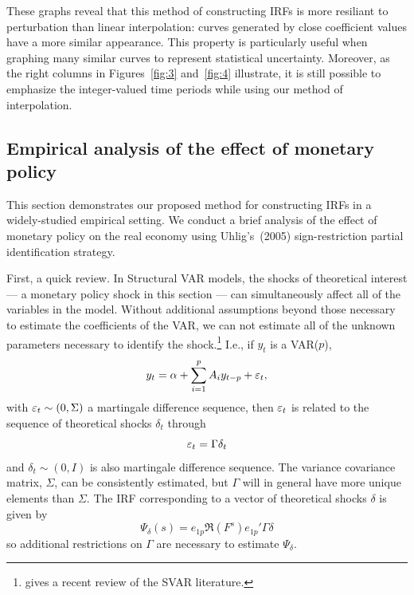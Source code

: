 \documentclass[12pt,fleqn]{article}
\begin{document}
These graphs reveal that this method of constructing IRFs is more
resiliant to perturbation than linear interpolation: curves generated
by close coefficient values have a more similar appearance. This
property is particularly useful when graphing many similar curves to
represent statistical uncertainty. Moreover, as the right columns in
Figures~\ref{fig:3} and~\ref{fig:4} illustrate, it is still possible
to emphasize the integer-valued time periods while using our method of
interpolation.

\subsection{Empirical analysis of the effect of monetary policy}
\label{S3.2}

This section demonstrates our proposed method for constructing IRFs
in a widely-studied empirical setting. We conduct a brief analysis of
the effect of monetary policy on the real economy using Uhlig's~(2005)
sign-restriction partial identification strategy.

First, a quick review. In Structural VAR models, the shocks of
theoretical interest --- a monetary policy shock in this section ---
can simultaneously affect all of the variables in the model. Without
additional assumptions beyond those necessary to estimate the
coefficients of the VAR, we can not estimate all of the unknown
parameters necessary to identify the shock.\footnote{%
  \citet{Kil:13} gives a recent review of the SVAR literature.} %
I.e., if $y_t$ is a VAR($p$),
\begin{equation}
  \label{eq:13}
  y_t = \alpha + \sum_{i=1}^p A_i y_{t-p} + \varepsilon_t,
\end{equation}
with $\varepsilon_t \sim (0, \Sigma)$ a martingale difference sequence, then
$\varepsilon_t$ is related to the sequence of theoretical shocks $\delta_t$
through
\begin{equation*}
  \varepsilon_t = \Gamma \delta_t
\end{equation*}
and $\delta_t \sim (0, I)$ is also martingale difference sequence. The
variance covariance matrix, $\Sigma$, can be consistently estimated,
but $\Gamma$ will in general have more unique elements than $\Sigma$.
The IRF corresponding to a vector of theoretical shocks $\delta$ is
given by
\begin{equation}
  \label{eq:14}
  \Psi_\delta(s) = e_{1p} \Re(F^s) e_{1p}' \Gamma \delta
\end{equation}
so additional restrictions on $\Gamma$ are necessary to estimate
$\Psi_\delta$.
\end{document}
